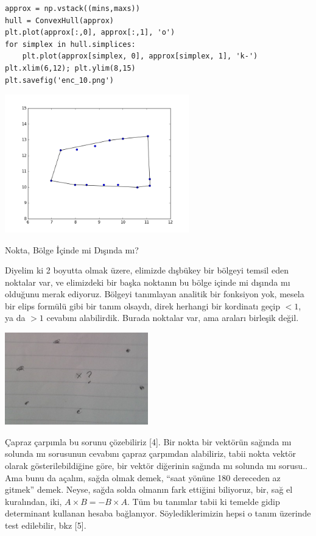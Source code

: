 \documentclass[12pt,fleqn]{article}\usepackage{../../common}
\begin{document}
\begin{verbatim}
approx = np.vstack((mins,maxs))
hull = ConvexHull(approx)
plt.plot(approx[:,0], approx[:,1], 'o')
for simplex in hull.simplices:
    plt.plot(approx[simplex, 0], approx[simplex, 1], 'k-')
plt.xlim(6,12); plt.ylim(8,15)
plt.savefig('enc_10.png')
\end{verbatim}

\includegraphics[height=6cm]{enc_10.png}

Nokta, Bölge İçinde mi Dışında mı?

Diyelim ki 2 boyutta olmak üzere, elimizde dışbükey bir bölgeyi temsil eden
noktalar var, ve elimizdeki bir başka noktanın bu bölge içinde mi dışında
mı olduğunu merak ediyoruz. Bölgeyi tanımlayan analitik bir fonksiyon yok,
mesela bir elips formülü gibi bir tanım olsaydı, direk herhangi bir
kordinatı geçip $<1$, ya da $>1$ cevabını alabilirdik. Burada noktalar var,
ama araları birleşik değil.

\includegraphics[height=4cm]{enc_05.png}

Çapraz çarpımla bu sorunu çözebiliriz [4]. Bir nokta bir vektörün sağında
mı solunda mı sorusunun cevabını çapraz çarpımdan alabiliriz, tabii nokta
vektör olarak gösterilebildiğine göre, bir vektör diğerinin sağında mı
solunda mı sorusu.. Ama bunu da açalım, sağda olmak demek, ``saat yönüne
180 dereceden az gitmek'' demek. Neyse, sağda solda olmanın fark ettiğini
biliyoruz, bir, sağ el kuralından, iki, $A \times B = -B \times A$. Tüm bu
tanımlar tabii ki temelde gidip determinant kullanan hesaba
bağlanıyor. Söylediklerimizin hepsi o tanım üzerinde test edilebilir, bkz
[5].
\end{document}
